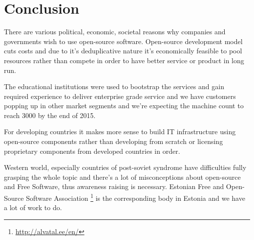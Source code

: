 \documentclass{article}
\begin{document}
\section{Conclusion}

There are various political, economic, societal reasons why
companies and governments wish to use open-source software.
Open-source development model cuts costs and due to
it's deduplicative nature it's economically feasible
to pool resources rather
than compete in order to have better service or product in long run.

The educational institutions were used to bootstrap the services and
gain required experience to deliver enterprise grade service and
we have customers popping up in other market segments
and we're expecting the machine count to reach 3000 by the end of 2015.

For developing countries it makes more sense to build
IT infrastructure using open-source components
rather than developing from scratch or licensing proprietary
components from developed countries in order.

Western world, especially countries of post-soviet syndrome
have difficulties fully grasping the whole topic and there's
a lot of misconceptions about open-source and Free Software,
thus awareness raising is necessary.
Estonian Free and Open-Source Software Association
\footnote{\url{http://alvatal.ee/en/}}
is the corresponding body in Estonia and we have a lot of work to do.









\end{document}
